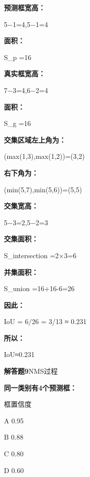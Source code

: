 \documentclass[UTF8,openany,oneside,zihao=-4,fontset=windows]{ctexbook}
\newif\ifshowsolutions
\newcommand{\Question}[2]{%
  \par\Needspace{4\baselineskip}\medskip
  \noindent\textbf{\color{MVBlue}#1}\quad #2\par
}
\newenvironment{AnswerBox}{\begin{tcolorbox}[breakable,colback=MVLight,colframe=MVBlue!45,title={参考答案},fonttitle=\bfseries,boxrule=0.55pt,arc=1.5mm,left=2mm,right=2mm,top=1.5mm,bottom=1.5mm]}{\end{tcolorbox}}
\newcommand{\PracticeSpace}[1]{\ifshowsolutions\else\par\vspace{#1}\par\fi}
\begin{document}
\begin{AnswerBox}
\par\noindent\textbf{预测框宽高：}
\par 5−1=4,5−1=4
\par\noindent\textbf{面积：}
\begin{center}\small\ttfamily S\_p =16\end{center}
\par\noindent\textbf{真实框宽高：}
\par 7−3=4,6−2=4
\par\noindent\textbf{面积：}
\begin{center}\small\ttfamily S\_g =16\end{center}
\par\noindent\textbf{交集区域左上角为：}
\par (max(1,3),max(1,2))=(3,2)
\par\noindent\textbf{右下角为：}
\par (min(5,7),min(5,6))=(5,5)
\par\noindent\textbf{交集宽高：}
\par 5−3=2,5−2=3
\par\noindent\textbf{交集面积：}
\begin{center}\small\ttfamily S\_intersection =2×3=6\end{center}
\par\noindent\textbf{并集面积：}
\begin{center}\small\ttfamily S\_union =16+16-6=26\end{center}
\par\noindent\textbf{因此：}
\begin{center}\small\ttfamily IoU = 6/26 = 3/13 ≈ 0.231\end{center}
\par\noindent\textbf{所以：}
\par IoU≈0.231
\end{AnswerBox}
\else
\PracticeSpace{4.2cm}
\fi
\Question{解答题9}{NMS过程}
\par\noindent\textbf{同一类别有4个预测框：}
\par 框\quad 置信度
\begin{CodeBlock}
A    0.95
\end{CodeBlock}
\begin{CodeBlock}
B    0.88
\end{CodeBlock}
\begin{CodeBlock}
C    0.80
\end{CodeBlock}
\begin{CodeBlock}
D    0.60
\end{CodeBlock}
\end{document}
